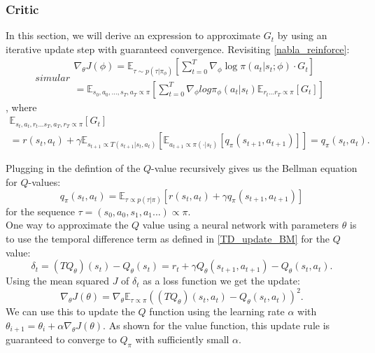 \subsubsection{Critic}
In this section, we will derive an expression to approximate $G_t$ by using an iterative update step with guaranteed convergence.
Revisiting \ref{nabla_reinforce}: 
\begin{equation}
    \label{ac policy update}simular
    \begin{aligned}
        \nabla_{\theta} J(\phi) = \mathbb{E}_{\tau \sim p(\tau | \pi_{\phi})} \left[ \sum_{t=0}^T \nabla_{\phi} \log \pi(a_t|s_t;\phi) \cdot  G_t\right]\\
        = \mathbb{E}_{s_0, a_0, ... ,s_T, a_T \propto \pi} \left[
            \sum_{t=0}^{T}\nabla_{\phi} log \pi_{\phi}(a_t|s_t) \mathbb{E}_{r_t...r_T \propto \pi} \left[ G_t \right]
        \right]
    \end{aligned}
\end{equation}
, where 
\begin{equation}
    \begin{align}
        \mathbb{E}_{s_t, a_t, r_t...s_T, a_T, r_T \propto \pi} \left[ G_t \right] \\
        = r(s_t,a_t) + \gamma \mathbb{E}_{s_{t+1} \propto T(s_{t+1}|s_t, a_t)}\left[\mathbb{E}_{a_{t+1} \propto \pi(\cdot|s_t)}  \left[q_{\pi}(s_{t+1},a_{t+1})\right]  \right]
        = q_{\pi}(s_{t},a_{t}).
    \end{align}
\end{equation}

Plugging in the defintion of the $Q$-value recursively gives us the Bellman equation for $Q$-values:
\begin{equation}
q_{\pi}(s_t, a_t) = \mathbb{E}_{\tau \propto p(\tau|\pi)} \left[ r(s_t,a_t) + \gamma q_{\pi}(s_{t+1}, a_{t+1})\right]
\end{equation}
for the sequence $\tau = (s_0,a_0, s_1, a_1...) \propto \pi$.\\

One way to approximate the $Q$ value using a neural network with parameters $\theta$ is to use the temporal difference term as defined in \ref{TD_update_BM} for the $Q$ value:
\begin{equation}
    \label{Q-ValueTD}
    \delta_t = (T Q_{\theta})(s_t) - Q_{\theta}(s_t) = r_t + \gamma Q_{\theta}(s_{t+1}, a_{t+1}) - Q_{\theta}(s_{t}, a_{t}).
\end{equation}
Using the mean squared $J$ of $\delta_t$ as a loss function we get the update:
\begin{equation}
    \nabla_{\theta} J(\theta) = \nabla_{\theta} \mathbb{E}_{\tau \propto \pi}((T Q_{\theta})(s_t, a_t) - Q_{\theta}(s_t, a_t))^2.
\end{equation}
We can use this to update the $Q$ function using the learning rate $\alpha$ with $\theta_{i+1} = \theta_i + \alpha \nabla_{\theta} J(\theta)$. As shown for the value 
function, this update rule is guaranteed to converge to $Q_{\pi}$ with sufficiently small $\alpha$.

